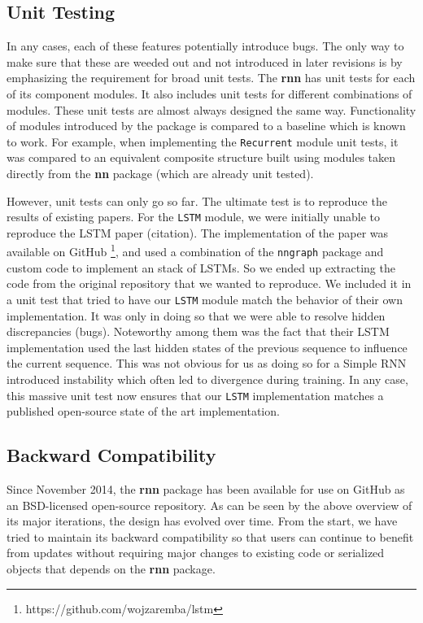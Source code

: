 \documentclass{article} %
\providecommand{\inlinecode}[1]{\texttt{#1}}
\begin{document}
\subsection{Unit Testing}
In any cases, each of these features potentially introduce bugs. The only way to 
make sure that these are weeded out and not introduced in later revisions is by 
emphasizing the requirement for broad unit tests. The \textbf{rnn} has unit tests 
for each of its component modules. It also includes unit tests for different combinations 
of modules. These unit tests are almost always designed the same way. Functionality of 
modules introduced by the package is compared to a baseline which is known to work.
For example, when implementing the \inlinecode{Recurrent} module unit tests, it was 
compared to an equivalent composite structure built using modules taken directly from the \textbf{nn} package (which are already unit tested).

However, unit tests can only go so far. The ultimate test is to reproduce the results of existing papers.
For the \inlinecode{LSTM} module, we were initially unable to reproduce the LSTM paper (citation). 
The implementation of the paper was available on GitHub \footnote{https://github.com/wojzaremba/lstm}, 
and used a combination of the \inlinecode{nngraph} package and 
custom code to implement an stack of LSTMs.
So we ended up extracting the code from the original repository that we wanted to reproduce.
We included it in a unit test that tried to have our \inlinecode{LSTM} module match the behavior 
of their own implementation. It was only in doing so that we were able to resolve hidden discrepancies (bugs).
Noteworthy among them was the fact that their LSTM implementation used the last hidden states of the 
previous sequence to influence the current sequence. This was not obvious for us as doing so for 
a Simple RNN introduced instability which often led to divergence during training.
In any case, this massive unit test now ensures that our \inlinecode{LSTM} implementation matches 
a published open-source state of the art implementation.

\subsection{Backward Compatibility}

Since November 2014, the \textbf{rnn} package has been available for use on GitHub as an BSD-licensed open-source repository.
As can be seen by the above overview of its major iterations, the design has evolved over time.
From the start, we have tried to maintain its backward compatibility so that users 
can continue to benefit from updates without requiring major changes to existing code 
or serialized objects that depends on the \textbf{rnn} package.
\end{document}

